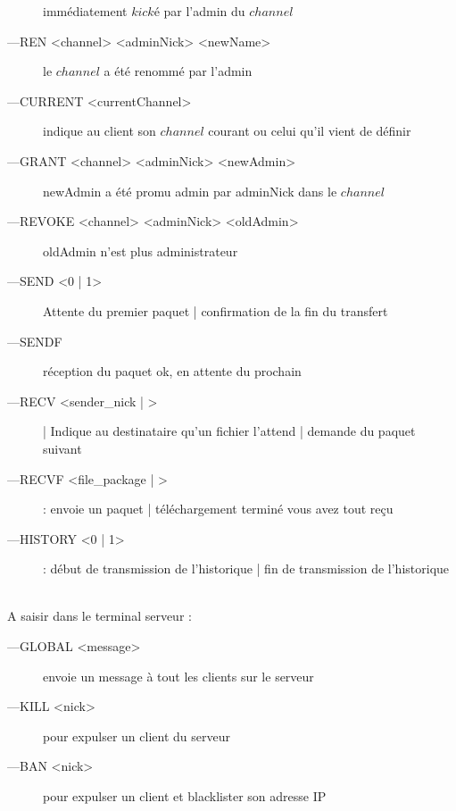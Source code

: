 \documentclass[12pt]{article}
\begin{document}
\begin{description}
    immédiatement $kické$ par l'admin du $channel$
    \item[---REN <channel> <adminNick> <newName>]  le $channel$ a été renommé par l'admin
    \item[---CURRENT <currentChannel>]  indique au client son $channel$ courant ou celui qu'il vient de définir
    \item[---GRANT <channel> <adminNick> <newAdmin>]  newAdmin a été promu admin par adminNick dans le $channel$
    \item[---REVOKE <channel> <adminNick> <oldAdmin>]  oldAdmin n'est plus administrateur
    \item[---SEND <0 | 1>]  Attente du premier paquet | confirmation de la fin du transfert
    \item[---SENDF]  réception du paquet ok, en attente du prochain
    \item[---RECV <sender\_nick | >] | Indique au destinataire qu'un fichier l'attend | demande du paquet suivant
    \item[---RECVF <file\_package | >] :  envoie un paquet | téléchargement terminé vous avez tout reçu
    \item[---HISTORY <0 | 1>] :  début de transmission de l'historique | fin de transmission de l'historique
    \\
\end{description}

\\A saisir dans le terminal serveur : 
\begin{description}
    \item[---GLOBAL <message>]  envoie un message à tout les clients sur le serveur
    \item[---KILL <nick>]  pour expulser un client du serveur
    \item[---BAN <nick>]  pour expulser un client et blacklister son adresse IP
    \\
\end{description}


\end{document}
